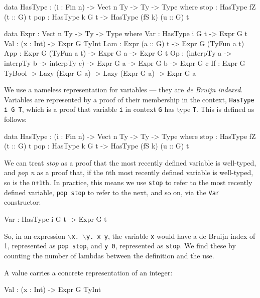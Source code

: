 \begin{code}[caption={Expression representation},label=exprty, float=htp]
data HasType : (i : Fin n) -> Vect n Ty -> Ty -> Type where
    stop : HasType fZ (t :: G) t
    pop  : HasType k G t -> HasType (fS k) (u :: G) t

data Expr : Vect n Ty -> Ty -> Type where
    Var : HasType i G t -> Expr G t
    Val : (x : Int) -> Expr G TyInt
    Lam : Expr (a :: G) t -> Expr G (TyFun a t)
    App : Expr G (TyFun a t) -> Expr G a -> Expr G t
    Op  : (interpTy a -> interpTy b -> interpTy c) -> Expr G a ->
          Expr G b -> Expr G c
    If  : Expr G TyBool -> Lazy (Expr G a) -> Lazy (Expr G a) -> Expr G a
\end{code}

\noindent
We use a nameless representation for variables --- they are \emph{de Bruijn indexed}.
Variables are represented by a proof of their membership in the context, \texttt{HasType i G T}, which is a proof that variable \texttt{i} in context  \texttt{G} has type \texttt{T}. This is defined as follows:

\begin{code}
data HasType : (i : Fin n) -> Vect n Ty -> Ty -> Type where
    stop : HasType fZ (t :: G) t
    pop  : HasType k G t -> HasType (fS k) (u :: G) t
\end{code}

\noindent
We can treat \emph{stop} as a proof that the most recently defined variable is well-typed, and \emph{pop n} as a proof that, if the \texttt{n}th most recently defined variable is well-typed, so is the \texttt{n+1}th.
In practice, this means we use \texttt{stop} to refer to the most recently defined variable, \texttt{pop stop} to refer to the next, and so on, via the \texttt{Var} constructor:

\begin{code}
Var : HasType i G t -> Expr G t
\end{code}

\noindent
So, in an expression \texttt{$\backslash$x. $\backslash$y. x y},  the variable \texttt{x} would have a de Bruijn index of 1, represented as \texttt{pop stop}, and \texttt{y 0}, represented as \texttt{stop}.
We find these by counting the number of lambdas between the definition and the use.

\noindent
A value carries a concrete representation of an integer: 

\begin{code}
Val : (x : Int) -> Expr G TyInt
\end{code}

